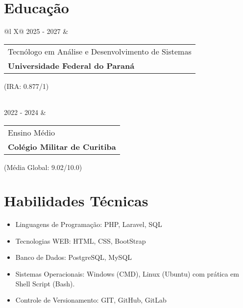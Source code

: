 \documentclass[a4paper,12pt]{article}
\begin{document}
\section{Educação}
\begin{tabularx}{\linewidth}{@{}l X@{}}
    2025 - 2027 & 
    \begin{tabular}[t]{@{}l@{}} 
        Tecnólogo em Análise e Desenvolvimento de Sistemas \\
        \textbf{Universidade Federal do Paraná}
    \end{tabular}
    \hfill \normalsize (IRA: 0.877/1) \\
    
     \\

    \addlinespace[5pt]

    2022 - 2024 & 
    \begin{tabular}[t]{@{}l@{}}
        Ensino Médio \\
        \textbf{Colégio Militar de Curitiba}
    \end{tabular}
    \hfill (Média Global: 9.02/10.0) \\
\end{tabularx}



\section{Habilidades Técnicas}
\begin{itemize}[noitemsep, nolistsep, leftmargin=*]
  \item Linguagens de Programação: PHP, Laravel, SQL
  \item Tecnologias WEB: HTML, CSS, BootStrap
  \item Banco de Dados: PostgreSQL, MySQL
  \item Sistemas Operacionais: Windows (CMD), Linux (Ubuntu) com prática em Shell Script (Bash).
  \item Controle de Versionamento: GIT, GitHub, GitLab
\end{itemize}
\end{document}
